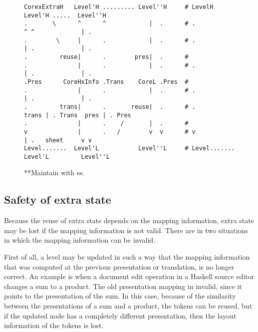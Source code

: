 \begin{figure}
\begin{center}
\begin{center}
\bc\begin{footnotesize}
\begin{verbatim}
CorexExtraH   Level'H ......... Level''H     # LevelH       Level'H .....  Level''H     
.       \      ^      ^            |  .      # .              ^ ^             | .       
.        \     |      .            |  .      # .              | .             | .       
.         reuse|      .        pres|  .      #
.              |      .            |  .      # .              | .             | .       
.Pres      CoreHxInfo .Trans    CoreL .Pres  #
.              |      .            |  .      # .              | .             | .       
.         trans|      .       reuse|  .      # .        trans | . Trans  pres | . Pres  
.              |      .    /       |  .      #
v              |      .   /        v  v      # v              | .   sheet     v v       
Level.......  Level'L           Level''L     # Level....... Level'L         Level''L    
\end{verbatim}
\end{footnotesize}
\ec
\end{center}
\caption{**Maintain with es.}\label{layerExtraState} 
\end{center}
\end{figure}




%																
\subsection{Safety of extra state}

Because the reuse of extra state depends on the mapping information, extra state may be lost if the mapping information is not valid. There are in two situations in which the mapping information can be invalid.  

First of all, a level may be updated in such a way that the mapping information that was computed at the previous presentation or translation, is no longer correct. An example is when a document edit operation in a Haskell source editor changes a sum to a product. The old presentation mapping in invalid, since it points to the presentation of the sum. In this case, because of the similarity between the presentations of a sum and a product, the tokens can be reused, but if the updated node has a completely different presentation, then the layout information of the tokens is lost.

